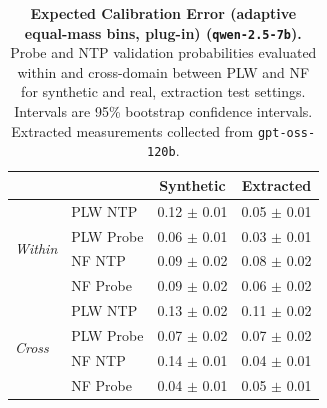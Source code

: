 \begin{table}[ht]
\centering
\begin{tabular}{ll cc}
\toprule
& & Synthetic & Extracted \\
\midrule
\multirow{4}{*}{\textit{Within}}
& PLW NTP & 0.12 $\pm$ 0.01 & 0.05 $\pm$ 0.01 \\
& PLW Probe & 0.06 $\pm$ 0.01 & 0.03 $\pm$ 0.01 \\
& NF NTP & 0.09 $\pm$ 0.02 & 0.08 $\pm$ 0.02 \\
& NF Probe & 0.09 $\pm$ 0.02 & 0.06 $\pm$ 0.02 \\
\midrule
\multirow{4}{*}{\textit{Cross}}
& PLW NTP & 0.13 $\pm$ 0.02 & 0.11 $\pm$ 0.02 \\
& PLW Probe & 0.07 $\pm$ 0.02 & 0.07 $\pm$ 0.02 \\
& NF NTP & 0.14 $\pm$ 0.01 & 0.04 $\pm$ 0.01 \\
& NF Probe & 0.04 $\pm$ 0.01 & 0.05 $\pm$ 0.01 \\
\bottomrule
\end{tabular}
\caption{\textbf{Expected Calibration Error (adaptive equal-mass bins, plug-in) (\texttt{qwen-2.5-7b}).} Probe and NTP validation probabilities evaluated within and cross-domain between PLW and NF for synthetic and real, extraction test settings. Intervals are 95\% bootstrap confidence intervals. Extracted measurements collected from \texttt{gpt-oss-120b}.}
\label{tab:qwen-2.5-7b-gpt-oss-120b-pond_nfix-ece_em}
\end{table}
